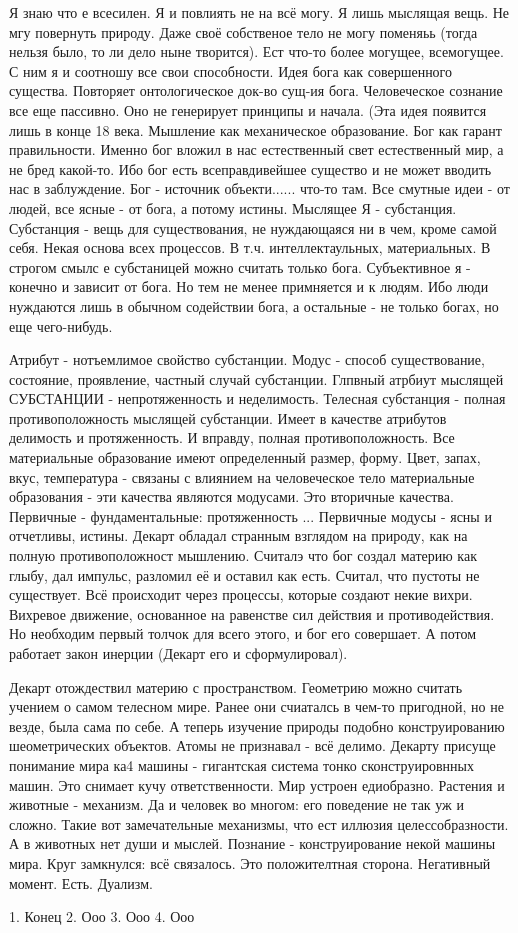Я знаю что е всесилен. Я и повлиять не на всё могу. Я лишь мыслящая вещь. Не мгу повернуть природу. Даже своё собственое тело не могу поменяьь (тогда нельзя было, то ли дело ныне творится). Ест  что-то более могущее, всемогущее. С ним я и соотношу все свои способности. Идея бога как совершенного существа. Повторяет онтологическое док-во сущ-ия бога.
Человеческое сознание все еще пассивно. Оно не генерирует принципы и начала. (Эта идея появится лишь в конце 18 века. Мышление как механическое образование. Бог как гарант правильности. Именно бог вложил в нас естественный свет естественный мир, а не бред какой-то. Ибо бог есть всеправдивейшее существо и не может вводить нас в заблуждение. Бог - источник объекти...... что-то там.
Все смутные идеи - от людей, все ясные - от бога, а потому истины. Мыслящее Я - субстанция.
Субстанция - вещь для существования, не нуждающаяся ни в чем, кроме самой себя. Некая основа всех процессов. В т.ч. интеллектаульных, материальных. В строгом смылс е субстаницей можно считать только бога. Субъективное я - конечно и зависит от бога. Но тем не менее примняется и к людям. Ибо люди нуждаются лишь в обычном содействии бога, а остальные - не только богах, но еще чего-нибудь.

Атрибут - нотъемлимое свойство субстанции. Модус - способ существование, состояние, проявление, частный случай субстанции. Глпвный атрбиут мыслящей СУБСТАНЦИИ - непротяженность и неделимость. Телесная субстанция - полная противоположность мыслящей субстанции. Имеет в качестве атрибутов делимость и протяженность. И вправду, полная противоположность. Все материальные образование имеют определенный размер, форму. Цвет, запах, вкус, температура - связаны с влиянием на человеческое тело материальные образования - эти качества являются модусами. Это вторичные качества. Первичные - фундаментальные: протяженность ...
Первичные модусы - ясны и отчетливы, истины.
Декарт обладал странным взглядом на природу, как на полную противоположност мышлению. Считалэ что бог создал материю как глыбу, дал импульс, разломил её и оставил как есть. Считал, что пустоты не существует. Всё происходит через процессы, которые создают некие вихри. Вихревое движение, основанное на равенстве сил действия и противодействия. Но необходим первый толчок для всего этого, и бог его совершает. А потом работает закон инерции (Декарт его и сформулировал).

Декарт отождествил материю с пространством. Геометрию можно считать учением о самом телесном мире. Ранее они счиаталсь в чем-то пригодной, но не везде, была сама по себе. А теперь изучение природы подобно конструированию шеометрических объектов. Атомы не признавал - всё делимо. Декарту присуще понимание мира ка4 машины - гигантская система тонко сконструировнных машин. Это снимает кучу ответственности. Мир устроен едиобразно. Растения и животные - механизм. Да и человек во многом: его поведение не так уж и сложно. Такие вот замечательные механизмы, что ест иллюзия целессобразности. А в животных нет души и мыслей. Познание - конструирование некой  машины мира. Круг замкнулся: всё связалось. Это положителтная сторона.
Негативный момент. Есть. Дуализм.

	1. Конец
	2. Ооо
	3. Ооо
	4. Ооо

